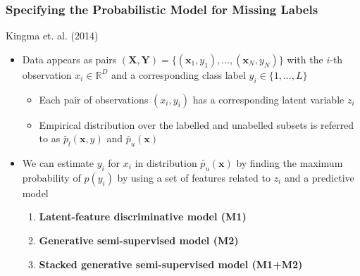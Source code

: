 \documentclass{beamer}
\begin{document}
\begin{frame}
  \frametitle{Specifying the Probabilistic Model for Missing Labels}

  Kingma et. al. (2014)
  
    \begin{itemize}
  \item Data appears as pairs $(\mathbf{X}, \mathbf{Y}) =
    \{(\mathbf{x}_1, y_1), ..., (\mathbf{x}_N, y_N)\}$
  with the $i$-th observation $x_i \in \mathbb{R}^D$ and a
  corresponding class label $y_i \in \{1, ..., L\}$

  \begin{itemize}
\item Each pair of observations $(x_i,y_i)$ has a corresponding
  latent variable $z_i$

\item Empirical distribution over the labelled and unabelled subsets
  is referred to as $\tilde{p_l}(\mathbf{x}, y)$ and
  $\tilde{p_u}(\mathbf{x})$
  \end{itemize}
\item We can estimate $y_i$ for $x_i$ in distribution
  $\tilde{p_u}(\mathbf{x})$ by finding the maximum
  probability of $p(y_i)$ by using a set of features
  related to $z_i$ and a predictive model
  \begin{enumerate}
  \item \textbf{Latent-feature discriminative model (M1)}
  \item \textbf{Generative semi-supervised model (M2)}
  \item \textbf{Stacked generative semi-supervised model (M1+M2)}
  \end{enumerate}
  \end{itemize}
\end{frame}
\end{document}
